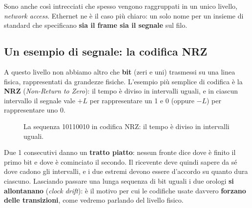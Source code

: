 Sono anche così intrecciati che spesso vengono raggruppati in un unico livello, \emph{network access}. Ethernet ne è il caso più
chiaro: un solo nome per un insieme di standard che specificano \textbf{sia il frame sia il segnale} sul filo.

\subsection{Un esempio di segnale: la codifica NRZ}

A questo livello non abbiamo altro che \textbf{bit} (zeri e uni) trasmessi su una linea fisica, rappresentati da grandezze fisiche.
L'esempio più semplice di codifica è la \textbf{NRZ} (\emph{Non-Return to Zero}): il tempo è diviso in intervalli uguali, e in ciascun
intervallo il segnale vale $+L$ per rappresentare un 1 e $0$ (oppure $-L$) per rappresentare uno 0.

\begin{figure}[H]
\centering
{}
\caption{La sequenza 10110010 in codifica NRZ: il tempo è diviso in intervalli uguali.}
\end{figure}

Due 1 consecutivi danno un \textbf{tratto piatto}: nessun fronte dice dove è finito il primo bit e dove è cominciato il secondo. Il
ricevente deve quindi sapere da sé dove cadono gli intervalli, e i due estremi devono essere d'accordo su quanto dura ciascuno.
Lasciando passare una lunga sequenza di bit uguali i due orologi \textbf{si allontanano} (\emph{clock drift}): è il motivo per cui le
codifiche usate davvero \textbf{forzano delle transizioni}, come vedremo parlando del livello fisico.

